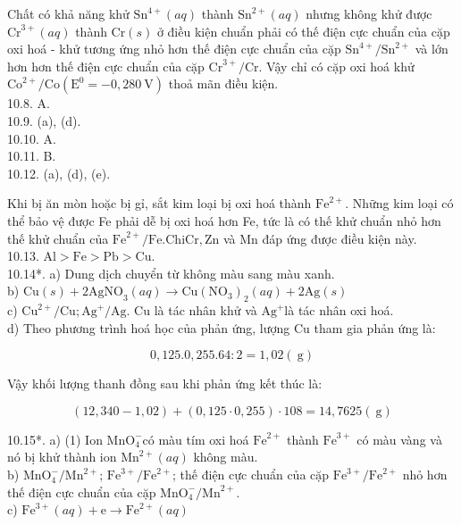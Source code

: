 \documentclass[10pt]{article}
\begin{document}
Chất có khả năng khử $\mathrm{Sn}^{4+}(a q)$ thành $\mathrm{Sn}^{2+}(a q)$ nhưng không khử được $\mathrm{Cr}^{3+}(a q)$ thành $\mathrm{Cr}(s)$ ở điều kiện chuẩn phải có thế điện cực chuẩn của cặp oxi hoá - khử tương ứng nhỏ hơn thế điện cực chuẩn của cặp $\mathrm{Sn}^{4+} / \mathrm{Sn}^{2+}$ và lớn hơn hơn thế điện cực chuẩn của cặp $\mathrm{Cr}^{3+} / \mathrm{Cr}$. Vậy chỉ có cặp oxi hoá khử $\mathrm{Co}^{2+} / \mathrm{Co}\left(\mathrm{E}^{0}=-0,280 \mathrm{~V}\right)$ thoả mãn điều kiện.\\
10.8. A.\\
10.9. (a), (d).\\
10.10. A.\\
10.11. B.\\
10.12. (a), (d), (e).

Khi bị ăn mòn hoặc bị gỉ, sắt kim loại bị oxi hoá thành $\mathrm{Fe}^{2+}$. Những kim loại có thể bảo vệ được Fe phải dễ bị oxi hoá hơn Fe, tức là có thế khử chuẩn nhỏ hơn thế khử chuẩn của $\mathrm{Fe}^{2+} / \mathrm{Fe} . \mathrm{Chi} \mathrm{Cr}, \mathrm{Zn}$ và Mn đáp ứng được điều kiện này.\\
10.13. $\mathrm{Al}>\mathrm{Fe}>\mathrm{Pb}>\mathrm{Cu}$.\\
10.14*. a) Dung dịch chuyển từ không màu sang màu xanh.\\
b) $\mathrm{Cu}(s)+2 \mathrm{AgNO}_{3}(a q) \rightarrow \mathrm{Cu}\left(\mathrm{NO}_{3}\right)_{2}(a q)+2 \mathrm{Ag}(s)$\\
c) $\mathrm{Cu}^{2+} / \mathrm{Cu} ; \mathrm{Ag}^{+} / \mathrm{Ag}$. Cu là tác nhân khử và $\mathrm{Ag}^{+}$là tác nhân oxi hoá.\\
d) Theo phương trình hoá học của phản ứng, lượng Cu tham gia phản ứng là:

$$
0,125.0,255.64: 2=1,02(\mathrm{~g})
$$

Vậy khối lượng thanh đồng sau khi phản ứng kết thúc là:

$$
(12,340-1,02)+(0,125 \cdot 0,255) \cdot 108=14,7625(\mathrm{~g})
$$

10.15*. a) (1) Ion $\mathrm{MnO}_{4}^{-}$có màu tím oxi hoá $\mathrm{Fe}^{2+}$ thành $\mathrm{Fe}^{3+}$ có màu vàng và nó bị khử thành ion $\mathrm{Mn}^{2+}(a q)$ không màu.\\
b) $\mathrm{MnO}_{4}^{-} / \mathrm{Mn}^{2+}$; $\mathrm{Fe}^{3+} / \mathrm{Fe}^{2+}$; thế điện cực chuẩn của cặp $\mathrm{Fe}^{3+} / \mathrm{Fe}^{2+}$ nhỏ hơn thế điện cực chuẩn của cặp $\mathrm{MnO}_{4}^{-} / \mathrm{Mn}^{2+}$.\\
c) $\mathrm{Fe}^{3+}(a q)+\mathrm{e} \rightarrow \mathrm{Fe}^{2+}(a q)$
\end{document}
